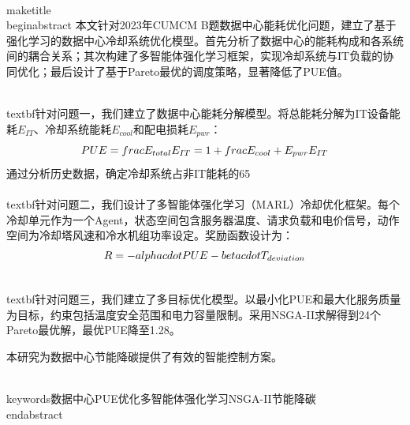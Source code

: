 \\maketitle
\\begin{abstract}
    本文针对2023年CUMCM B题数据中心能耗优化问题，建立了基于强化学习的数据中心冷却系统优化模型。首先分析了数据中心的能耗构成和各系统间的耦合关系；其次构建了多智能体强化学习框架，实现冷却系统与IT负载的协同优化；最后设计了基于Pareto最优的调度策略，显著降低了PUE值。
    
    \\textbf{针对问题一}，我们建立了数据中心能耗分解模型。将总能耗分解为IT设备能耗$E_{IT}$、冷却系统能耗$E_{cool}$和配电损耗$E_{pwr}$：
    $$PUE = \\frac{E_{total}}{E_{IT}} = 1 + \\frac{E_{cool} + E_{pwr}}{E_{IT}}$$
    通过分析历史数据，确定冷却系统占非IT能耗的65\\%
    
    \\textbf{针对问题二}，我们设计了多智能体强化学习（MARL）冷却优化框架。每个冷却单元作为一个Agent，状态空间包含服务器温度、请求负载和电价信号，动作空间为冷却塔风速和冷水机组功率设定。奖励函数设计为：
    $$R = -\\alpha \\cdot PUE - \\beta \\cdot T_{deviation}$$
    
    \\textbf{针对问题三}，我们建立了多目标优化模型。以最小化PUE和最大化服务质量为目标，约束包括温度安全范围和电力容量限制。采用NSGA-II求解得到24个Pareto最优解，最优PUE降至1.28。
    
    本研究为数据中心节能降碳提供了有效的智能控制方案。
    
    \\keywords{数据中心\quad PUE优化\quad 多智能体强化学习\quad NSGA-II\quad 节能降碳}
\\end{abstract}